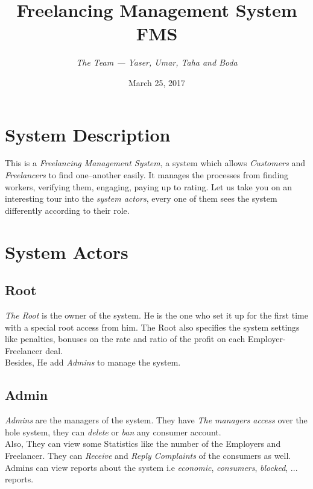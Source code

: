 \documentclass{article}
\begin{document}
    \title{Freelancing Management System \\
    \textbf{FMS}}
    \author{\textit{The Team --- Yaser, Umar, Taha and Boda}}
    \date{March 25, 2017}
\maketitle


\newpage
\tableofcontents
\newpage



\section{System Description}
  \hspace{0.5cm} This is a \textit{Freelancing Management System}, a system which
  allows \textit{Customers } and \textit{Freelancers} to find
  one--another easily. It manages the processes from finding workers,
  verifying them, engaging, paying up to rating.
  \hspace{0.3cm}Let us take you on an interesting tour into the
  \textit{system actors}, every one of them sees the system differently
  according to their role.

\section{System Actors}
\subsection{Root}
\hspace{0.5cm} \textit{The Root} is the owner of the system. He is the one
who set it up for the first time with a special root access from him.
The Root also specifies the system settings like penalties,
bonuses on the rate and ratio of the profit on each Employer-Freelancer deal. \\
Besides, He add \textit{Admins} to manage the system.









\subsection{Admin}
\hspace{0.5cm} \textit{Admins} are the managers of the system. They have
\textit{The managers access} over the hole system, they can \textit{delete}
or \textit{ban} any consumer account. \\
Also, They can view some Statistics like the number of the Employers and
Freelancer. They can \textit{Receive} and \textit{Reply Complaints} of the
consumers as well. \\Admins can view reports about the system
 i.e \textit{economic}, \textit{consumers}, \textit{blocked}, ...   reports.
\end{document}
